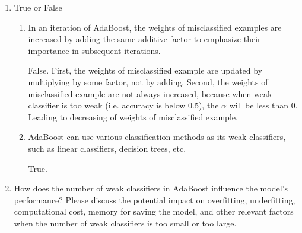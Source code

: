 \documentclass[twocolumn]{extarticle}
\begin{document}
\begin{enumerate}
	\item True or False
	\begin{enumerate}[label=\alph*.]
		\item In an iteration of AdaBoost, the weights of misclassified examples are increased by adding the same additive factor to emphasize their importance in subsequent iterations.
		
		False. First, the weights of misclassified example are updated by multiplying by some factor, not by adding. Second, the weights of misclassified example are not always increased, because when weak classifier is too weak (i.e. accuracy is below 0.5), the $\alpha$ will be less than 0. Leading to decreasing of weights of misclassified example.
		
		\item AdaBoost can use various classification methods as its weak classifiers, such as linear classifiers, decision trees, etc.
		
		True.
	\end{enumerate}
	\item How does the number of weak classifiers in AdaBoost influence the model's performance? Please discuss the potential impact on overfitting, underfitting, computational cost, memory for saving the model, and other relevant factors when the number of weak classifiers is too small or too large.
	

\end{enumerate}
\end{document}
